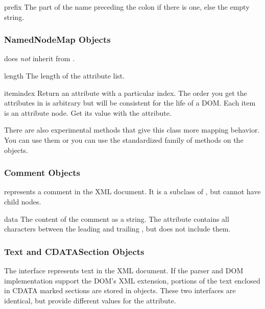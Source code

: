 \begin{memberdesc}[Attr]{prefix}
The part of the name preceding the colon if there is one, else the
empty string.
\end{memberdesc}


\subsubsection{NamedNodeMap Objects \label{dom-attributelist-objects}}

 does \emph{not} inherit from .

\begin{memberdesc}[NamedNodeMap]{length}
The length of the attribute list.
\end{memberdesc}

\begin{methoddesc}[NamedNodeMap]{item}{index}
Return an attribute with a particular index.  The order you get the
attributes in is arbitrary but will be consistent for the life of a
DOM.  Each item is an attribute node.  Get its value with the
 attribute.
\end{methoddesc}

There are also experimental methods that give this class more mapping
behavior.  You can use them or you can use the standardized
 family of methods on the 
objects.


\subsubsection{Comment Objects \label{dom-comment-objects}}

 represents a comment in the XML document.  It is a
subclass of , but cannot have child nodes.

\begin{memberdesc}[Comment]{data}
The content of the comment as a string.  The attribute contains all
characters between the leading \code{<!-}\code{-} and trailing
\code{-}\code{->}, but does not include them.
\end{memberdesc}


\subsubsection{Text and CDATASection Objects \label{dom-text-objects}}

The  interface represents text in the XML document.  If
the parser and DOM implementation support the DOM's XML extension,
portions of the text enclosed in CDATA marked sections are stored in
 objects.  These two interfaces are identical, but
provide different values for the  attribute.

